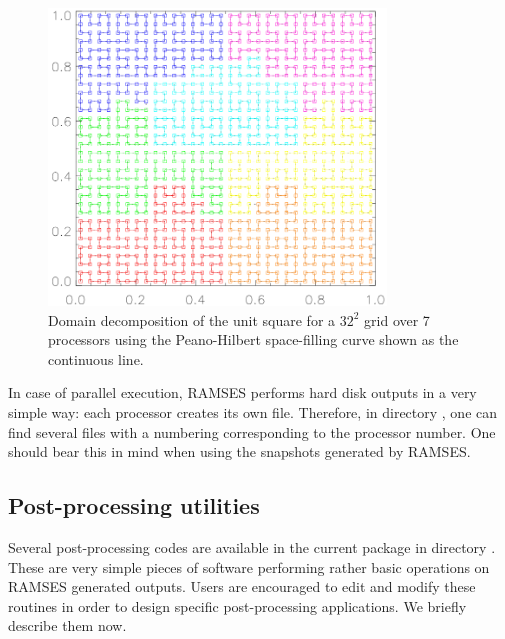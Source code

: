 \begin{figure}
   \begin{center}
   \includegraphics[width=0.8\textwidth]{img/hilbert.png}
   \end{center}
   \caption{Domain decomposition of the unit square for a $32^2$ grid
   over 7 processors using the Peano-Hilbert space-filling curve
   shown as the continuous line.}
   \label{fig:hilbert}
\end{figure}


In case of parallel execution, RAMSES performs hard disk outputs in a very
simple way: each processor creates its own file. Therefore, in directory
, one can find several files with a numbering
corresponding to the processor number. One should bear this in mind when
using the snapshots generated by RAMSES.

\subsection{Post-processing utilities}

Several post-processing codes are available in the current package in
directory . These are very simple pieces of software
performing rather basic operations on RAMSES generated outputs. Users are
encouraged to edit and modify these routines in order to design specific
post-processing applications. We briefly describe them now.

